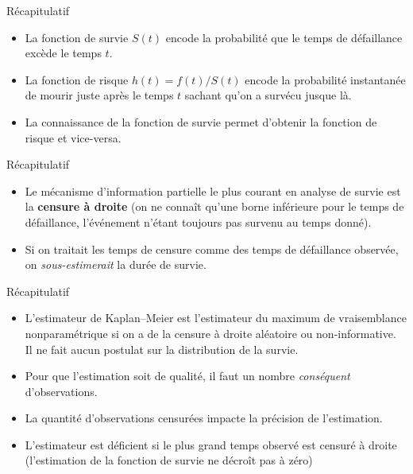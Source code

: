 \documentclass[
  ignorenonframetext,
]{beamer}
\providecommand{\tightlist}{%
  \setlength{\itemsep}{0pt}\setlength{\parskip}{0pt}}
\begin{document}
\begin{frame}{Récapitulatif}
\protect{}\label{ruxe9capitulatif-1}
\begin{itemize}
\tightlist
\item
  La fonction de survie \(S(t)\) encode la probabilité que le temps de
  défaillance excède le temps \(t\).
\item
  La fonction de risque \(h(t) = f(t)/S(t)\) encode la probabilité
  instantanée de mourir juste après le temps \(t\) sachant qu'on a
  survécu jusque là.
\item
  La connaissance de la fonction de survie permet d'obtenir la fonction
  de risque et vice-versa.
\end{itemize}
\end{frame}

\begin{frame}{Récapitulatif}
\protect{}\label{ruxe9capitulatif-2}
\begin{itemize}
\tightlist
\item
  Le mécanisme d'information partielle le plus courant en analyse de
  survie est la \textbf{censure à droite} (on ne connaît qu'une borne
  inférieure pour le temps de défaillance, l'événement n'étant toujours
  pas survenu au temps donné).
\item
  Si on traitait les temps de censure comme des temps de défaillance
  observée, on \emph{sous-estimerait} la durée de survie.
\end{itemize}
\end{frame}

\begin{frame}{Récapitulatif}
\protect{}\label{ruxe9capitulatif-3}
\begin{itemize}
\tightlist
\item
  L'estimateur de Kaplan--Meier est l'estimateur du maximum de
  vraisemblance nonparamétrique si on a de la censure à droite aléatoire
  ou non-informative. Il ne fait aucun postulat sur la distribution de
  la survie.
\item
  Pour que l'estimation soit de qualité, il faut un nombre
  \emph{conséquent} d'observations.
\item
  La quantité d'observations censurées impacte la précision de
  l'estimation.
\item
  L'estimateur est déficient si le plus grand temps observé est censuré
  à droite (l'estimation de la fonction de survie ne décroît pas à zéro)
\end{itemize}
\end{frame}
\end{document}
